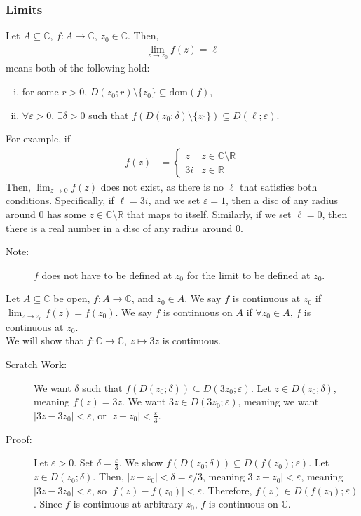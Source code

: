 \documentclass[10pt]{extarticle}
\newcommand{\R}{\mathbb{R}}
\newcommand{\C}{\mathbb{C}}
\begin{document}
  \subsubsection{Limits}%
  Let $A\subseteq \C$, $f: A\rightarrow \C$, $z_0\in \C$. Then,
  \begin{align*}
    \lim_{z\rightarrow z_{0}}f(z) = \ell
  \end{align*}
  means both of the following hold:
  \begin{enumerate}[(i)]
    \item for some $r > 0$, $D(z_{0};r)\setminus\{z_0\}\subseteq \text{dom}(f)$,
    \item $\forall \varepsilon > 0$, $\exists \delta > 0$ such that $f(D(z_0;\delta)\setminus \{z_0\}) \subseteq D(\ell;\varepsilon)$.
  \end{enumerate}
  For example, if
  \begin{align*}
    f(z) &= \begin{cases}
      z & z\in \C\setminus\R\\
      3i & z\in\R
    \end{cases}
  \end{align*}
  Then, $\lim_{z\rightarrow 0}f(z)$ does not exist, as there is no $\ell$ that satisfies both conditions. Specifically, if $\ell = 3i$, and we set $\varepsilon = 1$, then a disc of any radius around $0$ has some $z\in \C\setminus\R$ that maps to itself. Similarly, if we set $\ell = 0$, then there is a real number in a disc of any radius around $0$.
  \begin{description}
    \item[Note:] $f$ does not have to be defined at $z_0$ for the limit to be defined at $z_0$.
  \end{description}
  Let $A\subseteq \C$ be open, $f: A\rightarrow\C$, and $z_0\in A$. We say $f$ is continuous at $z_0$ if $\lim_{z\rightarrow z_{0}}f(z) = f(z_0)$. We say $f$ is continuous on $A$ if $\forall z_0\in A$, $f$ is continuous at $z_0$.\\

  We will show that $f: \C\rightarrow\C$, $z\mapsto 3z$ is continuous. 
  \begin{description}
    \item[Scratch Work:] We want $\delta$ such that $f(D(z_0;\delta))\subseteq D(3z_0;\varepsilon)$. Let $z\in D(z_0;\delta)$, meaning $f(z) = 3z$. We want $3z \in D(3z_0;\varepsilon)$, meaning we want $|3z-3z_0| < \varepsilon$, or $|z-z_0| < \frac{\varepsilon}{3}$.
    \item[Proof:] Let $\varepsilon > 0$. Set $\delta = \frac{\varepsilon}{3}$. We show $f(D(z_0;\delta))\subseteq D(f(z_0);\varepsilon)$. Let $z\in D(z_0;\delta)$. Then, $|z-z_0| < \delta=\varepsilon/3$, meaning $3|z-z_0| < \varepsilon$, meaning $|3z-3z_0| < \varepsilon$, so $|f(z)-f(z_0)| < \varepsilon$. Therefore, $f(z)\in D(f(z_0);\varepsilon)$. Since $f$ is continuous at arbitrary $z_0$, $f$ is continuous on $\C$.
  \end{description}
\end{document}
